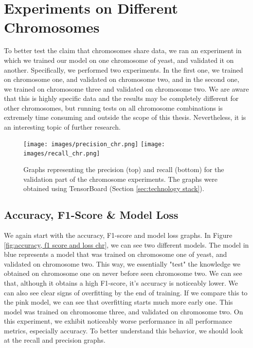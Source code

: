 \documentclass[times, utf8, diplomski, english]{fer_eng}
\begin{document}
\section{Experiments on Different Chromosomes}
\label{sec:experiments on different chromosomes}

To better test the claim that chromosomes share data, we ran an experiment in which we trained our model on one chromosome of yeast, and validated it on another. Specifically, we performed two experiments. In the first one, we trained on chromosome one, and validated on chromosome two, and in the second one, we trained on chromosome three and validated on chromosome two. We are aware that this is highly specific data and the results may be completely different for other chromosomes, but running tests on all chromosome combinations is extremely time consuming and outside the scope of this thesis. Nevertheless, it is an interesting topic of further research.

\begin{figure}[h]
	\centering
	\texttt{[image: images/precision\_chr.png]}
	\texttt{[image: images/recall\_chr.png]}
	\caption[Precision and recall graph on chromosomes]{Graphs representing the precision (top) and recall (bottom) for the validation part of the chromosome experiments. The graphs were obtained using TensorBoard (Section \ref{sec:technology stack}).}
	\label{fig:precision and recall chr}
\end{figure}

\subsection{Accuracy, F1-Score \& Model Loss}
\label{subsec:accuracy, f1-score and model loss chr}

We again start with the accuracy, F1-score and model loss graphs. In Figure \ref{fig:accuracy, f1 score and loss chr}, we can see two different models. The model in blue represents a model that was trained on chromosome one of yeast, and validated on chromosome two. This way, we essentially "test" the knowledge we obtained on chromosome one on never before seen chromosome two. We can see that, although it obtains a high F1-score, it's accuracy is noticeably lower. We can also see clear signs of overfitting by the end of training. If we compare this to the pink model, we can see that overfitting starts much more early one. This model was trained on chromosome three, and validated on chromosome two. On this experiment, we exhibit noticeably worse performance in all performance metrics, especially accuracy. To better understand this behavior, we should look at the recall and precision graphs.
\end{document}
